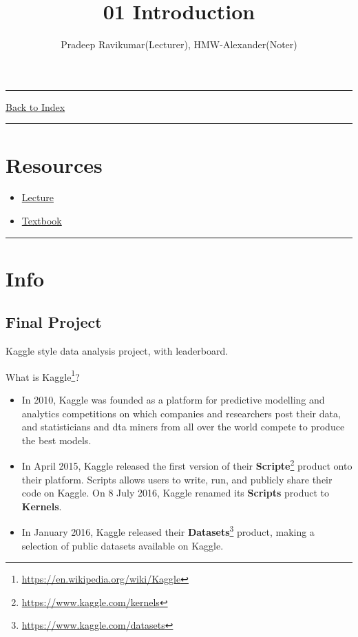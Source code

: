 \documentclass[letterpaper,10pt]{article}
\title{\textbf{01 Introduction}}
\author{Pradeep Ravikumar(Lecturer), HMW-Alexander(Noter)}
\newcommand{\panhline}{\begin{center}\rule{\textwidth}{1pt}\end{center}}
\begin{document}
\maketitle

\panhline
\href{../index.html}{Back to Index}

\panhline
\tableofcontents

\section*{Resources}

\begin{itemize}
	\item \href{../../Lectures/01_intro.pdf}{Lecture}
	\item \href{../../Books/Pattern_Recognition_And_Machine_Learning.pdf}{Textbook}
\end{itemize}

\panhline

\section{Info}

\subsection{Final Project}

Kaggle style data analysis project, with leaderboard.

What is Kaggle\footnote{\url{https://en.wikipedia.org/wiki/Kaggle}}?
\begin{itemize}
	\item In 2010, Kaggle was founded as a platform for predictive modelling and analytics competitions on which companies and researchers post their data, and statisticians and dta miners from all over the world compete to produce the best models.
	\item In April 2015, Kaggle released the first version of their \textbf{Scripte}\footnote{\url{https://www.kaggle.com/kernels}} product onto their platform. Scripts allows users to write, run, and publicly share their code on Kaggle. On 8 July 2016, Kaggle renamed its \textbf{Scripts} product to \textbf{Kernels}.
	\item In January 2016, Kaggle released their \textbf{Datasets}\footnote{\url{https://www.kaggle.com/datasets}} product, making a selection of public datasets available on Kaggle.
\end{itemize}
\end{document}
